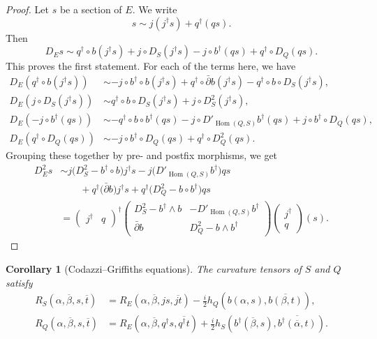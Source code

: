 \documentclass[10pt,a4paper]{article}
\newtheorem{coro}[theo]{Corollary}
\newtheorem*{proof}{Proof}
\def\ov#1{\overline{#1}}
\DeclareMathOperator{\Hom}{Hom}
\begin{document}
\begin{proof}
Let $s$ be a section of $E$. We write
\[
s \sim j (j^\dagger s) + q^\dagger( qs).
\]
Then
\[
D_E s
\sim q^\dagger \circ b (j^\dagger s)
+ j \circ D_S( j^\dagger s)
- j \circ b^\dagger (qs)
+ q^\dagger \circ D_Q (qs).
\]
This proves the first statement.
For each of the terms here, we have
\begin{align*}
D_E(q^\dagger \circ b (j^\dagger s))
&\sim -j \circ b^\dagger \circ b (j^\dagger s)
+ q^\dagger \circ \bar\partial b (j^\dagger s)
- q^\dagger \circ b \circ D_S(j^\dagger s),
\\
D_E(j \circ D_S( j^\dagger s))
&\sim q^\dagger \circ b \circ D_S(j^\dagger s)
+ j \circ D_S^2 (j^\dagger s),
\\
D_E(-j \circ b^\dagger (qs))
&\sim - q^\dagger \circ b \circ b^\dagger (qs)
- j \circ D'_{\Hom(Q,S)}b^\dagger (qs)
+ j \circ b^\dagger \circ D_Q(qs),
\\
D_E(q^\dagger \circ D_Q (qs))
&\sim -j \circ b^\dagger \circ D_Q(qs)
+ q^\dagger \circ D_Q^2 (qs).
\end{align*}
Grouping these together by pre- and postfix morphisms, we get
\begin{align*}
D_E^2 s
&\sim j \bigl( D_S^2 - b^\dagger \circ b \bigr) j^\dagger s
- j \bigl( D'_{\Hom(Q,S)} b^\dagger \bigr) qs
\\
&\qquad
+ q^\dagger \bigl( \bar\partial b \bigr) j^\dagger s
+ q^\dagger \bigl( D^2_Q - b \circ b^\dagger \bigr) qs
\\
&=
\begin{pmatrix}
j^\dagger & q
\end{pmatrix}^\dagger
\begin{pmatrix}
D^2_S - b^\dagger \wedge b & -D'_{\Hom(Q,S)} b^\dagger
\\
\bar\partial b & D^2_Q - b \wedge b^\dagger
\end{pmatrix}
\begin{pmatrix}
  j^\dagger \\ q
\end{pmatrix}(s).
\end{align*}
\end{proof}




\begin{coro}[Codazzi--Griffiths equations]
The curvature tensors of $S$ and $Q$ satisfy
\begin{align*}
R_S(\alpha, \ov\beta, s, \ov t)
&= R_E(\alpha, \ov\beta, js, \ov{jt})
- \tfrac i2 h_Q(b(\alpha, s), \ov{b(\beta, t)}),
\\
R_Q(\alpha, \ov\beta, s, \ov t)
&= R_E(\alpha, \ov\beta, q^\dagger s, \ov{q^\dagger t})
+ \tfrac i2 h_S(b^\dagger(\ov\beta, s), \ov{b^\dagger(\ov\alpha, t)}).
\end{align*}
\end{coro}
\end{document}
